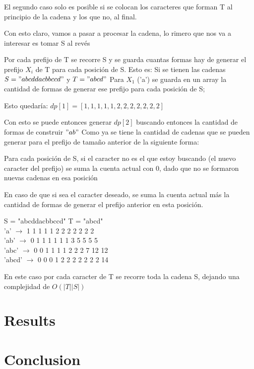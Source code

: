 \documentclass{article}
\begin{document}
El segundo caso solo es posible si se colocan los caracteres que forman T al principio de la cadena y los que no, al final.

Con esto claro, vamos a pasar a procesar la cadena, lo rimero que nos va a interesar es tomar S al revés

Por cada prefijo de T se recorre S y se guarda cuantas formas hay de generar el prefijo $X_i$ de T para cada posición de S.
Esto es:
Si se tienen las cadenas $S = "abcddacbbccd"$ y $T = "abcd"$
Para $X_1$ ('a')  se guarda en un array la cantidad de formas de generar ese prefijo para cada posición de S;

Esto quedaría: $dp[1] = [1,1,1,1,1,2,2,2,2,2,2,2]$

Con esto se puede entonces generar $dp[2]$ buscando entonces la cantidad de formas de construir $"ab"$
Como ya se tiene la cantidad de cadenas que se pueden generar para el prefijo de tamaño anterior de la siguiente forma:

Para cada posición de S, si el caracter no es el que estoy buscando (el nuevo caracter del prefijo)
se suma la cuenta actual con 0, dado que no se formaron nuevas cadenas en esa posición

En caso de que si sea el caracter deseado, se suma la cuenta actual más la cantidad de formas de generar el prefijo anterior en esta posición.

\begin{table}
    S = "abcddacbbccd"  T = "abcd" \\
    'a' $ \rightarrow$ 1 1 1 1 1 2 2 2 2 2 2 2\\ 
    'ab' $ \rightarrow$ 0 1 1 1 1 1 1 3 5 5 5 5 \\
    'abc' $ \rightarrow$ 0 0 1 1 1 1 2 2 2 7 12 12\\ 
    'abcd' $\rightarrow$ 0 0 0 1 2 2 2 2 2 2 2 14

\end{table}

En este caso por cada caracter de T se recorre toda la cadena S, dejando una complejidad de $O(|T||S|)$

\section{Results}

\section{Conclusion}
\end{document}
